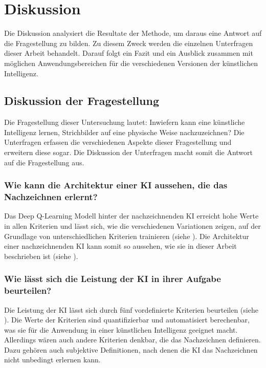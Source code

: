 \chapter{Diskussion}\label{chap:d} 
Die Diskussion analysiert die Resultate der Methode, um daraus eine Antwort auf
die Fragestellung zu bilden. Zu diesem Zweck werden die einzelnen Unterfragen
dieser Arbeit behandelt. Darauf folgt ein Fazit und ein Ausblick zusammen mit
möglichen Anwendungsbereichen für die verschiedenen Versionen der künstlichen
Intelligenz.

\section{Diskussion der Fragestellung}\label{chap:d_frage} 
Die Fragestellung dieser Untersuchung lautet: Inwiefern kann eine künstliche
Intelligenz lernen, Strichbilder auf eine physische Weise nachzuzeichnen? Die
Unterfragen erfassen die verschiedenen Aspekte dieser Fragestellung und
erweitern diese sogar. Die Diskussion der Unterfragen macht somit die Antwort
auf die Fragestellung aus.

\subsection{Wie kann die Architektur einer KI aussehen, die das Nachzeichnen
erlernt?}\label{subsub:d_frage_unter_1} Das Deep Q-Learning Modell hinter der
nachzeichnenden KI erreicht hohe Werte in allen Kriterien und lässt sich, wie
die verschiedenen Variationen zeigen, auf der Grundlage von unterschiedlichen
Kriterien trainieren (siehe ). Die Architektur
einer nachzeichnenden KI kann somit so aussehen, wie sie in dieser Arbeit
beschrieben ist (siehe ).


\subsection{Wie lässt sich die Leistung der KI in ihrer Aufgabe
beurteilen?}\label{subsub:d_frage_unter_2} Die Leistung der KI lässt sich durch
fünf vordefinierte Kriterien beurteilen (siehe ). Die
Werte der Kriterien sind quantifizierbar und automatisiert berechenbar, was sie
für die Anwendung in einer künstlichen Intelligenz geeignet macht. Allerdings
wären auch andere Kriterien denkbar, die das Nachzeichnen definieren. Dazu
gehören auch subjektive Definitionen, nach denen die KI das Nachzeichnen nicht
unbedingt erlernen kann. 

